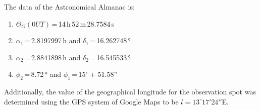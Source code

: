 The data of the Astronomical Almanac is: 

\begin{enumerate}
    \item $\Theta_G(0UT)$\,=\,14\,h\,52\,m\,28.7584\,s
    \item $\alpha_1$\,=\,2.8197997\,h and $\delta_1$\,=\,16.262748\,°
    \item $\alpha_2$\,=\,2.8841898\,h and $\delta_2$\,=\,16.545533\,°
    \item $\phi_2$\,=\,8.72\,° and $\phi_1$\,=\,15' + 51.58''
\end{enumerate}

Additionally, the value of the geographical longitude for the observation spot was determined using the GPS system of Google Maps to be $l=13^\circ 17' 24''$E.


%
%
